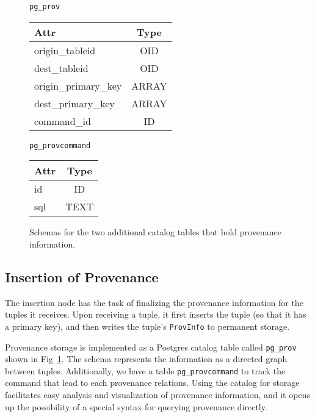 \begin{figure}
  \centering
  
\texttt{pg\_prov}\\

\begin{tabular}{|lc|}
  \hline
  Attr & Type \\
  \hline
  origin\_tableid & OID \\
  dest\_tableid & OID \\
  origin\_primary\_key & ARRAY \\
  dest\_primary\_key & ARRAY \\
  command\_id & ID \\
  \hline
\end{tabular}


\vspace{0.8cm}

\texttt{pg\_provcommand}\\

\begin{tabular}{|lc|}
  \hline
  Attr & Type \\
  \hline
  id & ID \\
  sql & TEXT \\
  \hline  
\end{tabular}
\caption{Schemas for the two additional catalog tables that hold provenance information.  }
\label{pgprov}
\end{figure}


\subsection{Insertion of Provenance}

The insertion node has the task of finalizing the provenance information for the tuples it receives. Upon receiving a tuple, it first inserts the tuple (so that it has a primary key), and then writes the tuple's \texttt{ProvInfo} to permanent storage. 

Provenance storage is implemented as a Postgres catalog table called \texttt{pg\_prov} shown in Fig~\ref{pgprov}. The schema represents the information as a directed graph between tuples. Additionally, we have a table \texttt{pg\_provcommand} to track the command that lead to each provenance relations. Using the catalog for storage facilitates easy analysis and visualization of provenance information, and it opens up the possibility of a special syntax for querying provenance directly. 

